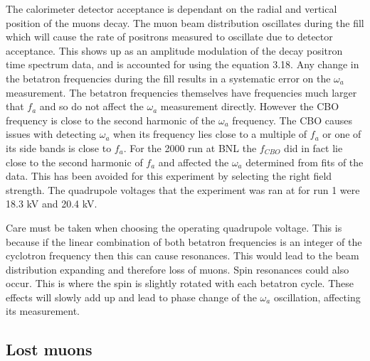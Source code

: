 The calorimeter detector acceptance is dependant on the radial and vertical position of the muons decay. The muon beam distribution oscillates during the fill which will cause the rate of positrons measured to oscillate due to detector acceptance. This shows up as an amplitude modulation of the decay positron time spectrum data, and is accounted for using the equation 3.18. Any change in the betatron frequencies during the fill results in a systematic error on the $\omega_{a}$ measurement. The betatron frequencies themselves have frequencies much larger that $f_{a}$ and so do not affect the $\omega_{a}$ measurement directly. However the CBO frequency is close to the second harmonic of the $\omega_{a}$ frequency. The CBO causes issues with detecting $\omega_{a}$ when its frequency lies close to a multiple of $f_{a}$ or one of its side bands is close to $f_{a}$. For the 2000 run at BNL the $f_{CBO}$ did in fact lie close to the second harmonic of $f_{a}$ and affected the $\omega_{a}$ determined from fits of the data. This has been avoided for this experiment by selecting the right field strength. The quadrupole voltages that the experiment was ran at for run 1 were 18.3 kV and 20.4 kV.

Care must be taken when choosing the operating quadrupole voltage. This is because if the linear combination of both betatron frequencies is an integer of the cyclotron frequency then this can cause resonances. This would lead to the beam distribution expanding and therefore loss of muons. Spin resonances could also occur. This is where the spin is slightly rotated with each betatron cycle. These effects will slowly add up and lead to phase change of the $\omega_{a}$ oscillation, affecting its measurement.

\subsection{Lost muons}

